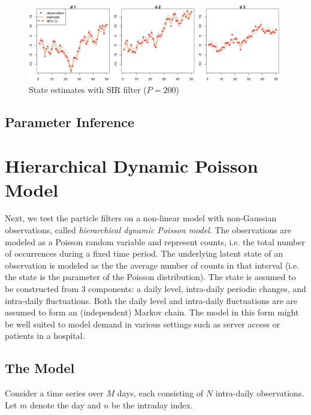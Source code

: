 \documentclass[11pt, oneside]{scrreprt}   	%
\begin{document}
\begin{figure}[h!]
\centering
\includegraphics[width=155mm]{../../images/mllm-estimate-sir.png}
\caption{State estimates with SIR filter ($P=200$)}
\label{fig:mllm_estimate_sir}
\end{figure}

\subsection{Parameter Inference}


\newpage
\section{Hierarchical Dynamic Poisson Model}
Next, we test the particle filters on a non-linear model with non-Gaussian observations, called \textit{hierarchical dynamic Poisson model}. The observations are modeled as a Poisson random variable and represent counts, i.e. the total number of occurrences during a fixed time period. The underlying latent state of an observation is modeled as the the average number of counts in that interval (i.e. the state is the parameter of the Poisson distribution). The state is assumed to be constructed from 3 components: a daily level, intra-daily periodic changes, and intra-daily fluctuations. Both the daily level and intra-daily fluctuations are are assumed to form an (independent) Markov chain. The model in this form might be well suited to model demand in various settings such as server access or patients in a hospital.

\subsection{The Model}
Consider a time series over $M$ days, each consisting of $N$ intra-daily observations. 
Let $m$ denote the day and $n$ be the intraday index.
\end{document}
